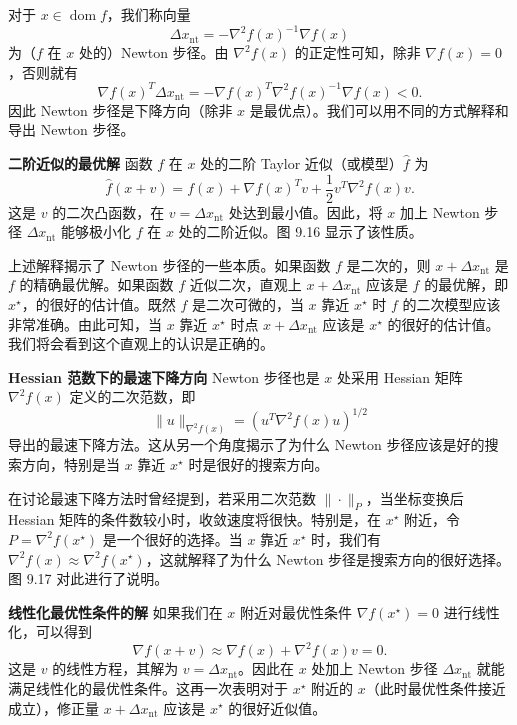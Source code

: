 \documentclass[UTF8, 12pt, fontset=fandol, oneside]{ctexart}
\begin{document}
对于 $x\in\operatorname{dom} f$，我们称向量
\[
\Delta x_{\mathrm{nt}}=-\nabla^2f(x)^{-1}\nabla f(x)
\]
为（$f$ 在 $x$ 处的）Newton 步径。由 $\nabla^2 f(x)$ 的正定性可知，除非 $\nabla f(x)=0$，否则就有
\[
\nabla f(x)^T\Delta x_{\mathrm{nt}}=-\nabla f(x)^T\nabla^2 f(x)^{-1}\nabla f(x)<0.
\]
因此 Newton 步径是下降方向（除非 $x$ 是最优点）。我们可以用不同的方式解释和导出 Newton 步径。

\noindent\textbf{二阶近似的最优解}\quad
函数 $f$ 在 $x$ 处的二阶 Taylor 近似（或模型）$\hat{f}$ 为
\begin{equation}
\hat{f}(x+v)=f(x)+\nabla f(x)^Tv+\frac{1}{2}v^T\nabla^2 f(x)v.
\tag{9.28}
\end{equation}
这是 $v$ 的二次凸函数，在 $v=\Delta x_{\mathrm{nt}}$ 处达到最小值。因此，将 $x$ 加上 Newton 步径 $\Delta x_{\mathrm{nt}}$ 能够极小化 $f$ 在 $x$ 处的二阶近似。图 9.16 显示了该性质。

上述解释揭示了 Newton 步径的一些本质。如果函数 $f$ 是二次的，则 $x+\Delta x_{\mathrm{nt}}$ 是 $f$ 的精确最优解。如果函数 $f$ 近似二次，直观上 $x+\Delta x_{\mathrm{nt}}$ 应该是 $f$ 的最优解，即 $x^\star$，的很好的估计值。既然 $f$ 是二次可微的，当 $x$ 靠近 $x^\star$ 时 $f$ 的二次模型应该非常准确。由此可知，当 $x$ 靠近 $x^\star$ 时点 $x+\Delta x_{\mathrm{nt}}$ 应该是 $x^\star$ 的很好的估计值。我们将会看到这个直观上的认识是正确的。

\noindent\textbf{Hessian 范数下的最速下降方向}\quad
Newton 步径也是 $x$ 处采用 Hessian 矩阵 $\nabla^2f(x)$ 定义的二次范数，即
\[
\|u\|_{\nabla^2 f(x)}=(u^T\nabla^2f(x)u)^{1/2}
\]
导出的最速下降方法。这从另一个角度揭示了为什么 Newton 步径应该是好的搜索方向，特别是当 $x$ 靠近 $x^\star$ 时是很好的搜索方向。

在讨论最速下降方法时曾经提到，若采用二次范数 $\|\cdot\|_P$，当坐标变换后 Hessian 矩阵的条件数较小时，收敛速度将很快。特别是，在 $x^\star$ 附近，令 $P=\nabla^2f(x^\star)$ 是一个很好的选择。当 $x$ 靠近 $x^\star$ 时，我们有 $\nabla^2f(x)\approx\nabla^2f(x^\star)$，这就解释了为什么 Newton 步径是搜索方向的很好选择。图 9.17 对此进行了说明。

\noindent\textbf{线性化最优性条件的解}\quad
如果我们在 $x$ 附近对最优性条件 $\nabla f(x^\star)=0$ 进行线性化，可以得到
\[
\nabla f(x+v)\approx\nabla f(x)+\nabla^2f(x)v=0.
\]
这是 $v$ 的线性方程，其解为 $v=\Delta x_{\mathrm{nt}}$。因此在 $x$ 处加上 Newton 步径 $\Delta x_{\mathrm{nt}}$ 就能满足线性化的最优性条件。这再一次表明对于 $x^\star$ 附近的 $x$（此时最优性条件接近成立），修正量 $x+\Delta x_{\mathrm{nt}}$ 应该是 $x^\star$ 的很好近似值。
\end{document}
